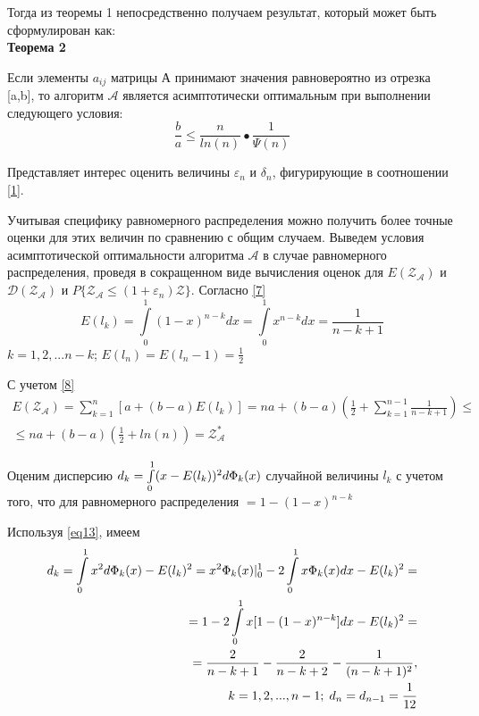 \documentclass[a4paper, 14pt]{extarticle}
\numberwithin{equation}{section}
\begin{document}
Тогда из теоремы 1 непосредственно получаем результат, который может быть сформулирован как:\\

\textbf{Теорема 2}

Если элементы $a_{ij}$ матрицы А принимают значения равновероятно из отрезка [a,b], то алгоритм $\mathcal{A}$ является асимптотически оптимальным при выполнении следующего условия:
\begin{equation}
\frac{b}{a} \leqslant \frac{n}{ln(n)}•\frac{1}{\Psi(n)}
\end{equation}

Представляет интерес оценить величины $\varepsilon_n$ и $\delta_n$, фигурирующие в соотношении \eqref{1}.

Учитывая специфику равномерного распределения можно получить более точные оценки для этих величин по сравнению с общим случаем. Выведем условия асимптотической оптимальности алгоритма $\mathcal{A}$ в случае равномерного распределения, проведя в сокращенном виде вычисления оценок для $E(\mathcal{Z_{A}})$ и $\mathcal{D(Z_{A})}$ и $P \{ \mathcal{Z_{A}} \leqslant (1+\varepsilon_n)\mathcal{Z} \}$. Согласно \eqref{7}
\begin{equation}\label{eq13} 
E(l_k) = \int\limits_0^1 (1-x)^{n-k}dx = \int\limits_0^1 x^{n-k}dx = \frac{1}{n-k+1}
\end{equation}
$k=1,2,...n-k$;   $ E(l_n) = E(l_n-1) = \frac{1}{2}$

С учетом \eqref{8}
\begin{equation}
\begin{aligned}
E(\mathcal{Z_{A}}) = \sum_{k=1}^{n} [a+(b-a)E(l_k)] = na +(b-a)(\frac{1}{2}+\sum_{k=1}^{n-1} \frac{1}{n-k+1}) \leqslant \\
\leqslant na+(b-a)(\frac{1}{2} + ln(n)) = \mathcal{Z^*_{A}}
\end{aligned}
\end{equation}

Оценим дисперсию $d_k=\int\limits_0^1 (x-E(l_k))^2 d\text{$\Phi_k(x)$}$ случайной величины $l_k$ с учетом того, что для равномерного распределения \chanceLklesserX{} $ = 1-(1-x)^{n-k}$

Используя \eqref{eq13}, имеем
\begin{equation}
\begin{aligned}
d_k = \int\limits_0^1 x^2 d \text{$\Phi_k(x)$}-E(l_k)^2=x^2 \text{$\Phi_k(x)$} 	
|_0^1 - 2 \int\limits_0^1 x \text{$\Phi_k(x)$}dx - E(l_k)^2=\\
= 1-2\int\limits_0^1 x[1-(1-x)^{n-k}]dx-E(l_k)^2 =\\
= \frac{2}{n-k+1} - \frac{2}{n-k+2} - \frac{1}{(n-k+1)^2}, \\ 
\; k=1,2,...,n-1; \; d_n = d_{n-1} = \frac{1}{12}
\end{aligned}
\end{equation}
\end{document}
